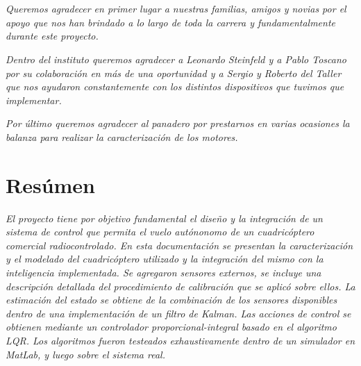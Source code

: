 \documentclass[main]{subfiles}
\begin{document}
\chapter*{}
\begin{flushright}
\textit{
Queremos agradecer en primer lugar a nuestras familias, amigos y novias 
por el apoyo que nos han brindado a lo largo de
toda la carrera y fundamentalmente durante este proyecto.}
\end{flushright}

\begin{flushright}
\textit{
Dentro del instituto queremos agradecer a Leonardo Steinfeld y a Pablo Toscano por su colaboraci\'on en m\'as de una oportunidad y a Sergio y Roberto del Taller que nos ayudaron constantemente con los distintos dispositivos que tuvimos que implementar.
}
\end{flushright} 

\begin{flushright}
\textit{
Por \'ultimo queremos agradecer al panadero por prestarnos en varias ocasiones la balanza para realizar la caracterizaci\'on de los motores.
}
\end{flushright}



\chapter*{Res\'umen}
\begin{flushright}
\textit{El proyecto tiene por objetivo fundamental el diseño y la integración de un sistema de control que permita el vuelo autónonomo de un cuadricóptero comercial radiocontrolado. En esta documentaci\'on se presentan la caracterizaci\'on y el modelado del cuadric\'optero utilizado y la integraci\'on del mismo con la inteligencia implementada. Se agregaron sensores externos, se incluye una descripci\'on detallada del procedimiento de calibraci\'on que se aplic\'o sobre ellos. La estimaci\'on del estado se obtiene de la combinaci\'on de los sensores disponibles dentro de una implementaci\'on de un filtro de Kalman. Las acciones de control se obtienen mediante un controlador proporcional-integral basado en el algoritmo LQR. Los algoritmos fueron testeados exhaustivamente dentro de un simulador en MatLab, y luego sobre el sistema real.
}
\end{flushright}
\
\end{document}
